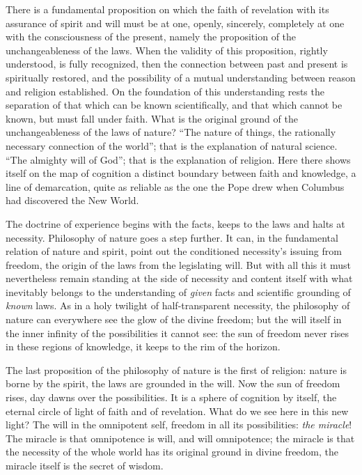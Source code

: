 \documentclass[12pt,a4paper,openany]{book}
\newcommand{\opage}[1]{\marginnote{\footnotesize\textit{[#1]}}}
\begin{document}
There is a fundamental proposition on which the faith of revelation
with its assurance of spirit and will must be at one,
openly, sincerely, completely at one with the consciousness of the present,
namely the proposition of the unchangeableness of the laws.
When the validity of this proposition, rightly understood, is fully
recognized, then the connection between past and present
is spiritually restored, and the possibility of a mutual understanding
between reason and religion established. On
the foundation of this understanding rests the separation of that
which can be known scientifically, and that which cannot be known,
but must fall under faith. What is the original
ground of the unchangeableness of the laws of nature? ``The nature of things,
the rationally necessary connection of the world''; that is the explanation of natural science.
``The almighty will of God''; that is the explanation of religion.
Here there shows itself on the map of cognition
a distinct boundary between faith and knowledge, a
line of demarcation, quite as reliable as the one the Pope
drew when Columbus had discovered the New World.

The doctrine of experience begins with the facts,
keeps to the laws and halts at necessity.
Philosophy of nature goes a step further. It can, in the fundamental relation
of nature and spirit, point out the conditioned necessity's
issuing from freedom, the origin of the laws from the legislating
will. But with all this it must nevertheless remain
standing at the side of necessity and content itself with what
inevitably belongs to the understanding of \emph{given}
\setcounter{footnote}{0}%
\opage{54}facts and scientific grounding of \emph{known}
laws. As in a holy twilight of half-transparent
necessity, the philosophy of nature can everywhere see the glow
of the divine freedom; but the will itself in
the inner infinity of the possibilities it cannot see: the
sun of freedom never rises in these regions of knowledge, it
keeps to the rim of the horizon.

The last proposition of the philosophy of nature is the first of religion:
nature is borne by the spirit, the laws are grounded in the will.
Now the sun of freedom rises, day dawns over the possibilities.
It is a sphere of cognition by itself, the eternal circle of light of faith and
of revelation. What do we see here in this new light?
The will in the omnipotent self, freedom in all its possibilities:
\emph{the miracle}! The miracle is that omnipotence is will, and
will omnipotence; the miracle is that the necessity of the whole world
has its original ground in divine freedom, the miracle
itself is the secret of wisdom.
\end{document}
